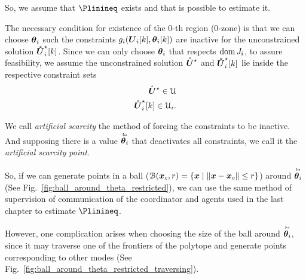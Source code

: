 \documentclass[../main.tex]{subfiles}
\begin{document}
So, we assume that $\Plinineq$ exists and that is possible to estimate it.

The necessary condition for existence of the $0$-th region ($0$-zone) is that we can choose $\boldsymbol{\theta}_i$ such the constraints $\inequalityfunction$ are inactive for the unconstrained solution $\optuncUik$.
Since we can only choose $\boldsymbol{\theta}_i$ that respects $\operatorname{dom} J_{i}$, to assure feasibility, we assume the unconstrained solution ${\mathring{\boldsymbol{U}}^{\star}}$ and $\optuncUik$ lie inside
the respective constraint sets
\begin{align}
  \optuncU\in\set{U}\\
  \optuncUik\in\set{U}_{i}.
\end{align}

\newcommand{\thetairestricted}{\overset{\rotatebox{90}{r}}{\thetai}}

We call \emph{artificial scarcity} the method of forcing the constraints to be inactive.
And supposing there is a value $\thetairestricted$ that deactivates all constraints, we call it the \emph{artificial scarcity point}.

So, if we can generate points in a ball ($\mathcal{B}(\boldsymbol{x}_{c},r)=\{\boldsymbol{x}\mid\left\lVert\boldsymbol{x}-\boldsymbol{x}_{c}\right\rVert\leq r\}$) around $\thetairestricted$ (See Fig.~\ref{fig:ball_around_theta_restricted}), we can use the same method of supervision of communication of the coordinator and agents used in the last chapter to estimate $\Plinineq$.

However, one complication arises when choosing the size of the ball around $\thetairestricted$, since it may traverse one of the frontiers of the polytope and generate points corresponding to other modes (See Fig.~\ref{fig:ball_around_theta_restricted_traversing}).
\end{document}
